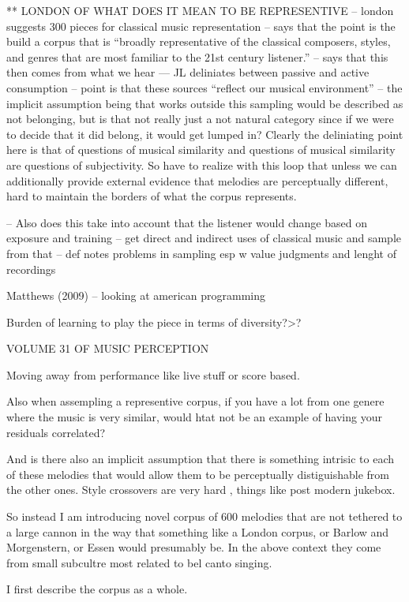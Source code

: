 \documentclass[]{book}
\begin{document}
** LONDON OF WHAT DOES IT MEAN TO BE REPRESENTIVE
-- london suggests 300 pieces for classical music representation
-- says that the point is the build a corpus that is ``broadly representative of the classical
composers, styles, and genres that are most familiar to the 21st century listener.''
-- says that this then comes from what we hear
--- JL deliniates between passive and active consumption
-- point is that these sources ``reflect our musical environment''
-- the implicit assumption being that works outside this sampling would be described as not belonging, but is that not really just a not natural category since if we were to decide that it did belong, it would get lumped in? Clearly the deliniating point here is that of questions of musical similarity and questions of musical similarity are questions of subjectivity. So have to realize with this loop that unless we can additionally provide external evidence that melodies are perceptually different, hard to maintain the borders of what the corpus represents.

-- Also does this take into account that the listener would change based on exposure and training
-- get direct and indirect uses of classical music and sample from that
-- def notes problems in sampling esp w value judgments and lenght of recordings

Matthews (2009) -- looking at american programming

Burden of learning to play the piece in terms of diversity?\textgreater{}?

VOLUME 31 OF MUSIC PERCEPTION

Moving away from performance like live stuff or score based.

Also when assempling a representive corpus, if you have a lot from one genere where the music is very similar, would htat not be an example of having your residuals correlated?

And is there also an implicit assumption that there is something intrisic to each of these melodies that would allow them to be perceptually distiguishable from the other ones.
Style crossovers are very hard , things like post modern jukebox.

So instead I am introducing novel corpus of 600 melodies that are not tethered to a large cannon in the way that something like a London corpus, or Barlow and Morgenstern, or Essen would presumably be.
In the above context they come from small subcultre most related to bel canto singing.

I first describe the corpus as a whole.
\end{document}
